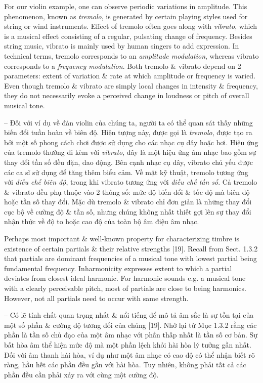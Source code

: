 \documentclass{article}
\begin{document}
\begin{itemize}
\begin{itemize}
\begin{itemize}
			For our violin example, one can observe periodic variations in amplitude. This phenomenon, known as {\it tremolo}, is generated by certain playing styles used for string or wind instruments. Effect of tremolo often goes along with {\it vibrato}, which is a musical effect consisting of a regular, pulsating change of frequency. Besides string music, vibrato is mainly used by human singers to add expression. In technical terms, tremolo corresponds to an {\it amplitude modulation}, whereas vibrato corresponds to a {\it frequency modulation}. Both tremolo \& vibrato depend on 2 parameters: extent of variation \& rate at which amplitude or frequency is varied. Even though tremolo \& vibrato are simply local changes in intensity \& frequency, they do not necessarily evoke a perceived change in loudness or pitch of overall musical tone.
			
			-- Đối với ví dụ về đàn violin của chúng ta, người ta có thể quan sát thấy những biến đổi tuần hoàn về biên độ. Hiện tượng này, được gọi là {\it tremolo}, được tạo ra bởi một số phong cách chơi được sử dụng cho các nhạc cụ dây hoặc hơi. Hiệu ứng của tremolo thường đi kèm với {\it vibrato}, đây là một hiệu ứng âm nhạc bao gồm sự thay đổi tần số đều đặn, dao động. Bên cạnh nhạc cụ dây, vibrato chủ yếu được các ca sĩ sử dụng để tăng thêm biểu cảm. Về mặt kỹ thuật, tremolo tương ứng với {\it điều chế biên độ}, trong khi vibrato tương ứng với {\it điều chế tần số}. Cả tremolo \& vibrato đều phụ thuộc vào 2 thông số: mức độ biến đổi \& tốc độ mà biên độ hoặc tần số thay đổi. Mặc dù tremolo \& vibrato chỉ đơn giản là những thay đổi cục bộ về cường độ \& tần số, nhưng chúng không nhất thiết gợi lên sự thay đổi nhận thức về độ to hoặc cao độ của toàn bộ âm điệu âm nhạc.
			
			Perhaps most important \& well-known property for characterizing timbre is existence of certain partials \& their relative strengths [19]. Recall from Sect. 1.3.2 that partials are dominant frequencies of a musical tone with lowest partial being fundamental frequency. Inharmonicity expresses extent to which a partial deviates from closest ideal harmonic. For harmonic sounds e.g. a musical tone with a clearly perceivable pitch, most of partials are close to being harmonics. However, not all partials need to occur with same strength.
			
			-- Có lẽ tính chất quan trọng nhất \& nổi tiếng để mô tả âm sắc là sự tồn tại của một số phần \& cường độ tương đối của chúng [19]. Nhớ lại từ Mục 1.3.2 rằng các phần là tần số chủ đạo của một âm nhạc với phần thấp nhất là tần số cơ bản. Sự bất hòa âm thể hiện mức độ mà một phần lệch khỏi hài hòa lý tưởng gần nhất. Đối với âm thanh hài hòa, ví dụ như một âm nhạc có cao độ có thể nhận biết rõ ràng, hầu hết các phần đều gần với hài hòa. Tuy nhiên, không phải tất cả các phần đều cần phải xảy ra với cùng một cường độ.
			

\end{itemize}
\end{itemize}
\end{itemize}
\end{document}
